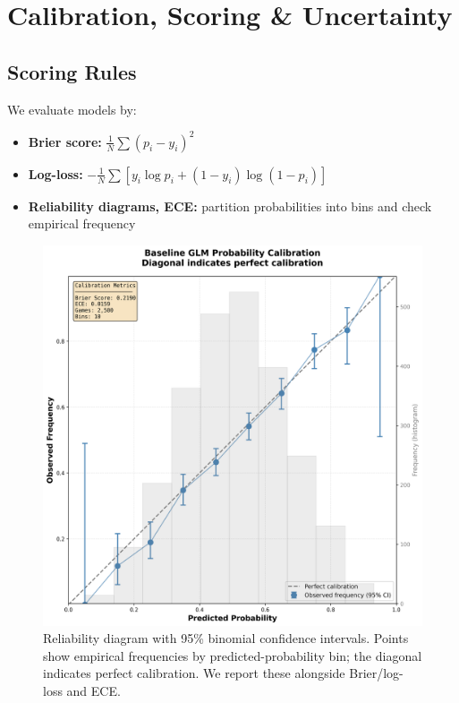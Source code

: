 \section{Calibration, Scoring \& Uncertainty}
\label{sec:calib}

\subsection{Scoring Rules}
We evaluate models by:
\begin{itemize}
  \item \textbf{Brier score:} \( \frac{1}{N} \sum (p_i - y_i)^2 \)
  \item \textbf{Log-loss:} \( -\frac{1}{N} \sum [y_i \log p_i + (1-y_i)\log(1-p_i)] \)
  \item \textbf{Reliability diagrams, ECE:} partition probabilities into bins and check empirical frequency
\end{itemize}

\begin{figure}[t]
  \centering
  \includegraphics[width=0.9\linewidth]{../figures/reliability_diagram.png}
  \caption[Reliability diagram (95\% CIs)]{Reliability diagram with 95\% binomial confidence intervals. Points show empirical frequencies by predicted-probability bin; the diagonal indicates perfect calibration. We report these alongside Brier/log-loss and ECE.}
  \label{fig:reliability}
\end{figure}

